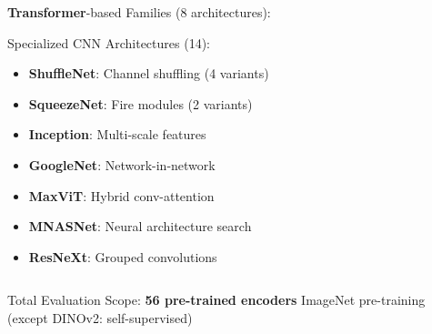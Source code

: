 \documentclass[aspectratio=43]{beamer}
\begin{document}
\begin{frame}
\begin{columns}
\begin{column}{0.5\textwidth}
\begin{block}{\tiny \textbf{Transformer}-based Families (8 architectures):}
            \end{block}
            \vspace{-0.3cm}
            \begin{block}{\tiny Specialized CNN Architectures (14):}
                \begin{itemize}
                    \tiny
                    \item \textbf{ShuffleNet}: Channel shuffling (4 variants)
                    \item \textbf{SqueezeNet}: Fire modules (2 variants)
                    \item \textbf{Inception}: Multi-scale features
                    \item \textbf{GoogleNet}: Network-in-network
                    \item \textbf{MaxViT}: Hybrid conv-attention
                    \item \textbf{MNASNet}: Neural architecture search
                    \item \textbf{ResNeXt}: Grouped convolutions
                \end{itemize}
            \end{block}
        \end{column}
    \end{columns}
    \begin{exampleblock}{\tiny Total Evaluation Scope:}
                \textbf{56 pre-trained encoders} ImageNet pre-training (except DINOv2: self-supervised)
    \end{exampleblock}
\end{frame}
\end{document}
